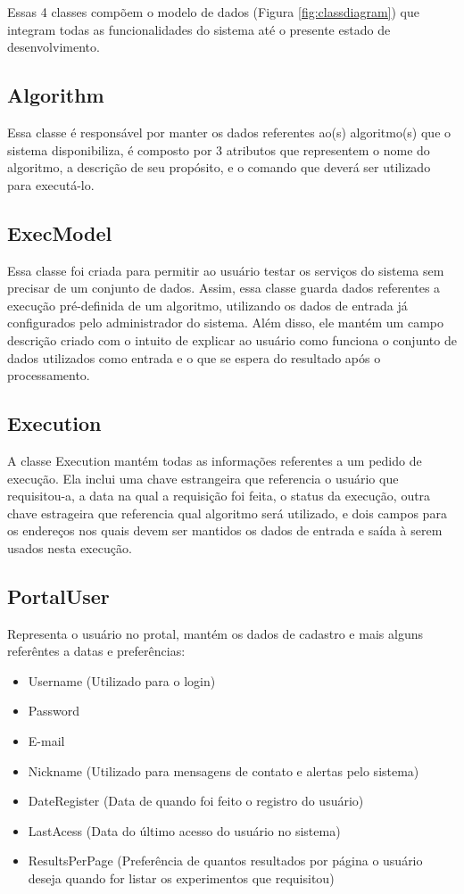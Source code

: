 \documentclass[tg]{mdtufsm}
\begin{document}
Essas 4 classes compõem o modelo de dados (Figura \ref{fig:classdiagram}) que integram todas as funcionalidades do sistema até o presente estado de desenvolvimento.

\subsection{Algorithm}
Essa classe é responsável por manter os dados referentes ao(s) algoritmo(s) que o sistema disponibiliza, é composto por 3 atributos que representem o nome do algoritmo, a descrição de seu propósito, e o comando que deverá ser utilizado para executá-lo.

\subsection{ExecModel}
Essa classe foi criada para permitir ao usuário testar os serviços do sistema sem precisar de um conjunto de dados. Assim, essa classe guarda dados referentes a execução pré-definida de um algoritmo, utilizando os dados de entrada já configurados pelo administrador do sistema. Além disso, ele mantém um campo descrição criado com o intuito de explicar ao usuário como funciona o conjunto de dados utilizados como entrada e o que se espera do resultado após o processamento.

\subsection{Execution}
A classe Execution mantém todas as informações referentes a um pedido de execução. Ela inclui uma chave estrangeira que referencia o usuário que requisitou-a, a data na qual a requisição foi feita, o status da execução, outra chave estrageira que referencia qual algoritmo será utilizado, e dois campos para os endereços nos quais devem ser mantidos os dados de entrada e saída à serem usados nesta execução.

\subsection{PortalUser}
Representa o usuário no protal, mantém os dados de cadastro e mais alguns referêntes a datas e preferências:

\begin{itemize}
	\item Username (Utilizado para o login)
	\item Password 
	\item E-mail
	\item Nickname (Utilizado para mensagens de contato e alertas pelo sistema)
	\item DateRegister (Data de quando foi feito o registro do usuário)
	\item LastAcess (Data do último acesso do usuário no sistema)
	\item ResultsPerPage (Preferência de quantos resultados por página o usuário deseja quando for listar os experimentos que requisitou)
\end{itemize}
\end{document}
